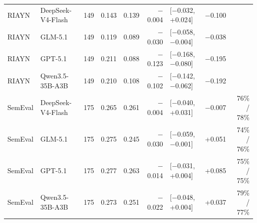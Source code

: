 \documentclass[10pt]{article}
\begin{document}
\begin{longtable}{llrrrrlrr}
RIAYN & DeepSeek-V4-Flash & 149 & 0.143 & 0.139 & $-$0.004 & [$-$0.032, +0.024] & $-$0.100 &  \\
RIAYN & GLM-5.1 & 149 & 0.119 & 0.089 & $-$0.030 & [$-$0.058, $-$0.004] & $-$0.038 &  \\
RIAYN & GPT-5.1 & 149 & 0.211 & 0.088 & $-$0.123 & [$-$0.168, $-$0.080] & $-$0.195 &  \\
RIAYN & Qwen3.5-35B-A3B & 149 & 0.210 & 0.108 & $-$0.102 & [$-$0.142, $-$0.062] & $-$0.192 &  \\
SemEval & DeepSeek-V4-Flash & 175 & 0.265 & 0.261 & $-$0.004 & [$-$0.040, +0.031] & $-$0.007 & 76\% / 78\% \\
SemEval & GLM-5.1 & 175 & 0.275 & 0.245 & $-$0.030 & [$-$0.059, $-$0.001] & +0.051 & 74\% / 76\% \\
SemEval & GPT-5.1 & 175 & 0.277 & 0.263 & $-$0.014 & [$-$0.031, +0.004] & +0.085 & 75\% / 75\% \\
SemEval & Qwen3.5-35B-A3B & 175 & 0.273 & 0.251 & $-$0.022 & [$-$0.048, +0.004] & +0.037 & 79\% / 77\% \\
\hline
\end{longtable}
\endgroup
\end{document}
